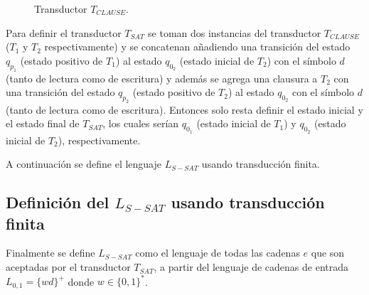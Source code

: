 \documentclass[12pt]{article}
\begin{document}
\begin{figure}[h]
    \centering {}
    \caption{Transductor $T_{CLAUSE}$.}
    \label{fig:transducer} %
\end{figure}

Para definir el transductor $T_{SAT}$ se toman dos instancias del transductor $T_{CLAUSE}$ ($T_1$ y $T_2$ respectivamente) 
y se concatenan añadiendo una transición del estado $q_{p_1}$ (estado positivo de $T_1$) al estado $q_{0_2}$
(estado inicial de $T_2$) con el símbolo $d$ (tanto de lectura como de escritura) y además se agrega una clausura a $T_2$ con una transición del estado $q_{p_2}$ (estado positivo de $T_2$) al estado $q_{0_2}$ con el símbolo $d$ (tanto de lectura como de escritura). Entonces solo resta definir el estado inicial y el estado final de $T_{SAT}$, los cuales serían $q_{0_1}$ (estado inicial de $T_1$) y $q_{0_2}$ (estado inicial de $T_2$), respectivamente.

A continuación se define el lenguaje $L_{S-SAT}$ usando transducción finita.

\subsection{Definición del $L_{S-SAT}$ usando transducción finita}

Finalmente se define $L_{S-SAT}$ como el lenguaje de todas las cadenas $e$ que son aceptadas por el transductor $T_{SAT}$, a partir del lenguaje
de cadenas de entrada $L_{0,1}=\{wd\}^+$ donde $w\in \{0,1\}^*$. 
\end{document}
